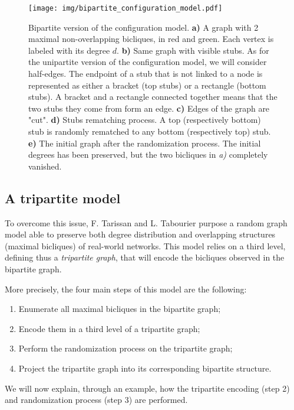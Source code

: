 \documentclass[table]{report}
\begin{document}
\begin{figure}[h]%
\centering
\texttt{[image: img/bipartite\_configuration\_model.pdf]}
\caption{Bipartite version of the configuration model. \textbf{a)} A graph with 2 maximal non-overlapping bicliques, in red and green. Each vertex is labeled with its degree $d$.
\textbf{b)} Same graph with visible stubs. As for the unipartite version of the configuration model, we will consider half-edges. The endpoint of a stub that is not linked to a node is represented as either a bracket (top stubs) or a rectangle (bottom stubs). A bracket and a rectangle connected together means that the two stubs they come from form an edge. 
\textbf{c)} Edges of the graph are "cut". 
\textbf{d)} Stubs rematching process. A top (respectively bottom) stub  is randomly rematched to any bottom (respectively top) stub. 
\textbf{e)} The initial graph after the randomization process. The initial degrees has been preserved, but the two bicliques in \textit{a)} completely vanished. 
}
\label{fig:bipartite_configuration_model}
\end{figure}
\FloatBarrier

\subsection{A tripartite model}


To overcome this issue, F. Tarissan and L. Tabourier purpose a random graph model able to preserve both degree distribution and overlapping structures (maximal bicliques) of real-world networks. This model relies on a third level, defining thus a \textit{tripartite graph}, that will encode the bicliques observed in the bipartite graph. 

\medbreak
\noindent
More precisely, the four main steps of this model are the following:
\begin{enumerate}[noitemsep]
    \item Enumerate all maximal bicliques in the bipartite graph;
    \item Encode them in a third level of a tripartite graph;
    \item Perform the randomization process on the tripartite graph;
    \item Project the tripartite graph into its corresponding bipartite structure.
\end{enumerate}


We will now explain, through an example, how the tripartite encoding (step 2) and randomization process (step 3) are performed. 
\end{document}
